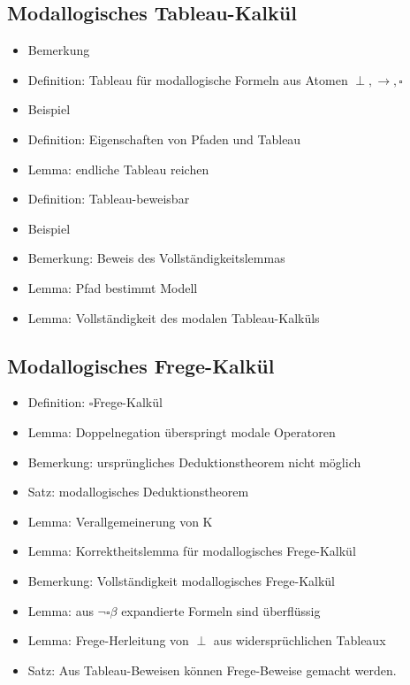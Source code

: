 \documentclass[8pt,fleqn,a4paper,twoside]{article}
\begin{document}
\begin{multicols}{2}
    \subsection{Modallogisches Tableau-Kalkül} %
    \label{sub:modallogisches_tableau_kalkül}
      \begin{itemize}
        \item Bemerkung
        \item Definition: Tableau für modallogische Formeln aus Atomen $\perp,\to,\square$
        \item Beispiel
        \item Definition: Eigenschaften von Pfaden und Tableau
        \item Lemma: endliche Tableau reichen
        \item Definition: Tableau-beweisbar
        \item Beispiel
        \item Bemerkung: Beweis des Vollständigkeitslemmas
        \item Lemma: Pfad bestimmt Modell
        \item Lemma: Vollständigkeit des modalen Tableau-Kalküls
      \end{itemize}

    \subsection{Modallogisches Frege-Kalkül} %
    \label{sub:modallogisches_frege_kalkül}
      \begin{itemize}
        \item Definition: $\square$Frege-Kalkül
        \item Lemma: Doppelnegation überspringt modale Operatoren
        \item Bemerkung: ursprüngliches Deduktionstheorem nicht möglich
        \item Satz: modallogisches Deduktionstheorem
        \item Lemma: Verallgemeinerung von K
        \item Lemma: Korrektheitslemma für modallogisches Frege-Kalkül
        \item Bemerkung: Vollständigkeit modallogisches Frege-Kalkül
        \item Lemma: aus $\lnot\square β$ expandierte Formeln sind überflüssig
        \item Lemma: Frege-Herleitung von $\perp$ aus widersprüchlichen Tableaux
        \item Satz: Aus Tableau-Beweisen können Frege-Beweise gemacht werden.
      \end{itemize}


\end{multicols}
\end{document}
